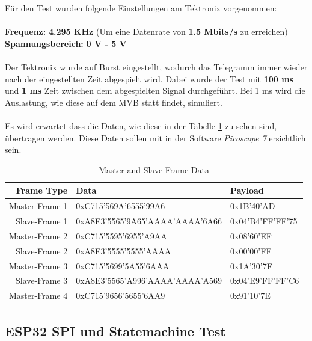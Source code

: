 Für den Test wurden folgende Einstellungen am Tektronix vorgenommen:\\
\\
\textbf{Frequenz:}\hspace{1.87cm} \textbf{4.295 KHz} (Um eine Datenrate von \textbf{1.5 Mbits/s} zu erreichen)\\
\textbf{Spannungsbereich:}\hspace{0.25cm} \textbf{0 V - 5 V}\\
\\
Der Tektronix wurde auf Burst eingestellt, wodurch das Telegramm immer wieder nach der eingestellten Zeit abgespielt wird.
Dabei wurde der Test mit \textbf{100 ms} und \textbf{1 ms} Zeit zwischen dem abgespielten Signal durchgeführt. Bei 1 ms wird die Auslastung, wie diese auf dem MVB statt findet,
simuliert.\\
\\
Es wird erwartet dass die Daten, wie diese in der Tabelle \ref{tab:frame_data} zu sehen sind, übertragen werden. Diese Daten sollen mit in der Software \textit{Picoscope 7} ersichtlich sein.

\begin{table}[h!]
    \centering
    \begin{tabular}{r||l||l}
        \toprule
        \textbf{Frame Type} & \textbf{Data}  & \textbf{Payload} \\ 
        \midrule
        Master-Frame 1 & 0xC715’569A’6555’99A6 & 0x1B'40'AD \\
        Slave-Frame 1  & 0xA8E3’5565’9A65’AAAA’AAAA’6A66 & 0x04'B4'FF'FF'75 \\
        \midrule
        Master-Frame 2 & 0xC715’5595’6955’A9AA & 0x08'60'EF \\
        Slave-Frame 2  & 0xA8E3’5555’5555’AAAA & 0x00'00'FF\\
        \midrule
        Master-Frame 3 & 0xC715’5699’5A55’6AAA & 0x1A'30'7F \\
        Slave-Frame 3  & 0xA8E3’5565’A996’AAAA’AAAA’A569 & 0x04'E9'FF'FF'C6 \\
        \midrule
        Master-Frame 4 & 0xC715’9656’5655’6AA9 & 0x91'10'7E\\
        \bottomrule
    \end{tabular}
    \caption{Master and Slave-Frame Data}
    \label{tab:frame_data}
\end{table}




\subsection{ESP32 SPI und Statemachine Test}
\label{sub:ESPSPIundFSMTest}

